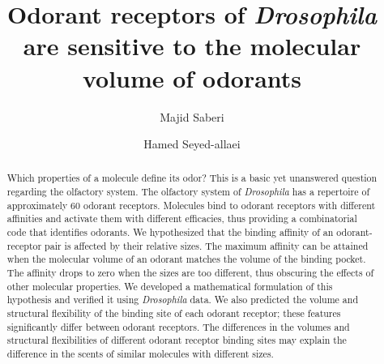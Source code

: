 \documentclass[fleqn,11pt]{wlscirep}
\title{Odorant receptors of \textit{Drosophila} are sensitive to the molecular volume of odorants}
\author[1]{Majid Saberi}
\author[1,*]{Hamed Seyed-allaei}
\affil[1]{School of Cognitive Sciences, Institute for Research in Fundamental Sciences (IPM), Tehran, Iran}
\affil[*]{hamed@ipm.ir}
\begin{document}

\begin{abstract} 
Which properties of a molecule define its odor? This is a basic yet unanswered question regarding the olfactory system. 
The olfactory system of \textit{Drosophila} has a repertoire of approximately 60 odorant receptors. 
Molecules bind to odorant receptors with different affinities and activate them with different efficacies, 
thus providing a combinatorial code that identifies odorants. 
We hypothesized that the binding affinity of an odorant-receptor pair is affected by their relative sizes. 
The maximum affinity can be attained when the molecular volume of an odorant matches the volume of the binding pocket. 
The affinity drops to zero when the sizes are too different, thus obscuring the effects of other molecular properties. 
We developed a mathematical formulation of this hypothesis and verified it using \textit{Drosophila} data. 
We also predicted the volume and structural flexibility of the binding site of each odorant receptor; these features significantly differ between odorant receptors. 
The differences in the volumes and structural flexibilities of different odorant receptor binding sites may explain the difference in the scents of similar molecules with different sizes. 
\end{abstract}

\flushbottom
\maketitle

\thispagestyle{empty}

\end{document}
